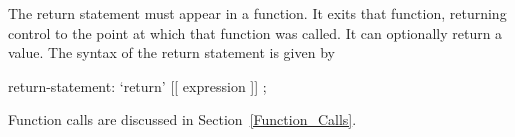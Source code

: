 The return statement must appear in a function.  It exits that
function, returning control to the point at which that function was
called.  It can optionally return a value.  The syntax of the return
statement is given by
\begin{syntax}
return-statement:
  `return' [[ expression ]] ;
\end{syntax}
Function calls are discussed in Section~\ref{Function_Calls}.
